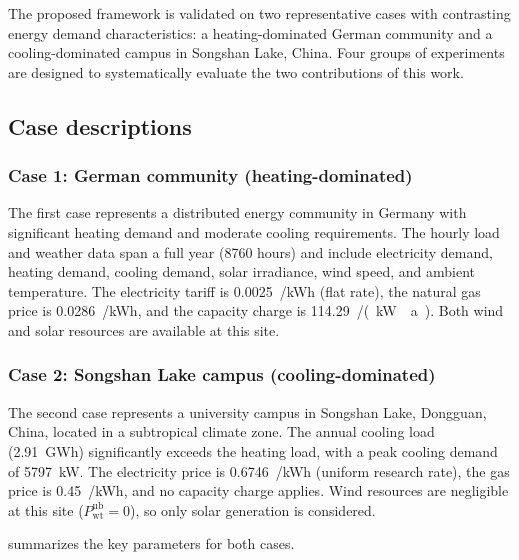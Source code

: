 The proposed framework is validated on two representative cases with contrasting energy demand characteristics: a heating-dominated German community and a cooling-dominated campus in Songshan Lake, China. Four groups of experiments are designed to systematically evaluate the two contributions of this work.

\subsection{Case descriptions}
\label{sec:case_desc}

\subsubsection{Case 1: German community (heating-dominated)}

The first case represents a distributed energy community in Germany with significant heating demand and moderate cooling requirements. The hourly load and weather data span a full year (8760 hours) and include electricity demand, heating demand, cooling demand, solar irradiance, wind speed, and ambient temperature. The electricity tariff is \SI{0.0025}{\text{\euro}/kWh} (flat rate), the natural gas price is \SI{0.0286}{\text{\euro}/kWh}, and the capacity charge is \SI{114.29}{\text{\euro}/(kW \cdot a)}. Both wind and solar resources are available at this site.

\subsubsection{Case 2: Songshan Lake campus (cooling-dominated)}

The second case represents a university campus in Songshan Lake, Dongguan, China, located in a subtropical climate zone. The annual cooling load (\SI{2.91}{GWh}) significantly exceeds the heating load, with a peak cooling demand of \SI{5797}{kW}. The electricity price is \SI{0.6746}{\text{\textyen}/kWh} (uniform research rate), the gas price is \SI{0.45}{\text{\textyen}/kWh}, and no capacity charge applies. Wind resources are negligible at this site ($P_{\text{wt}}^{\text{ub}} = 0$), so only solar generation is considered.

 summarizes the key parameters for both cases.

